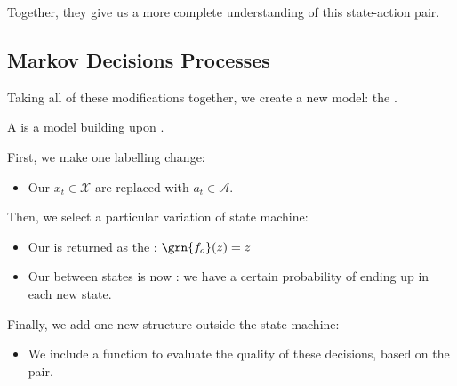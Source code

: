         Together, they give us a more complete understanding of this state-action pair.

        


        

        \pagebreak

    \subsection{Markov Decisions Processes}

        Taking all of these modifications together, we create a new model: the .\\

        \begin{definition}
            A  is a model building upon .

            First, we make one labelling change:

            \begin{itemize}
                \item Our  $x_t \in \mathcal{X}$ are replaced with  $a_t \in \mathcal{A}$.
            \end{itemize}

            \phantom{}

            Then, we select a particular variation of state machine:

            \begin{itemize}
                \item Our  is returned as the : $\grn{f_o}(z) = z$
                    
                \item Our  between states is now : we have a certain probability of ending up in each new state.

            \end{itemize}

            \phantom{}

            Finally, we add one new structure outside the state machine:
            
            \begin{itemize}
                \item We include a  function to evaluate the quality of these decisions, based on the  pair.
            \end{itemize}

        \end{definition}

